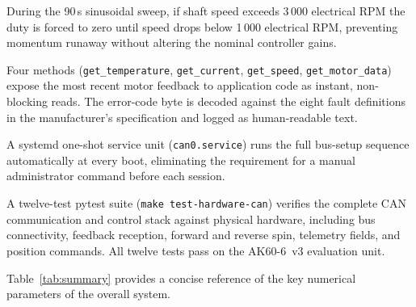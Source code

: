 \documentclass[12pt,a4paper]{article}
\begin{document}
\begin{description}[leftmargin=4.5cm, style=nextline]
  \item[Speed-brake safety net]
    During the 90\,s sinusoidal sweep, if shaft speed exceeds
    3\,000 electrical RPM the duty is forced to zero until speed
    drops below 1\,000 electrical RPM, preventing momentum runaway
    without altering the nominal controller gains.

  \item[Real-time telemetry]
    Four methods (\texttt{get\_temperature}, \texttt{get\_current},
    \texttt{get\_speed}, \texttt{get\_motor\_data}) expose the most recent
    motor feedback to application code as instant, non-blocking reads.
    The error-code byte is decoded against the eight fault definitions in
    the manufacturer's specification and logged as human-readable text.

  \item[Boot-time CAN initialisation]
    A systemd one-shot service unit (\texttt{can0.service}) runs the
    full bus-setup sequence automatically at every boot, eliminating the
    requirement for a manual administrator command before each session.

  \item[Automated hardware tests]
    A twelve-test pytest suite (\texttt{make test-hardware-can}) verifies
    the complete CAN communication and control stack against physical
    hardware, including bus connectivity, feedback reception, forward and
    reverse spin, telemetry fields, and position commands.  All twelve
    tests pass on the AK60-6~v3 evaluation unit.

\end{description}

Table~\ref{tab:summary} provides a concise reference of the key numerical
parameters of the overall system.
\end{document}
